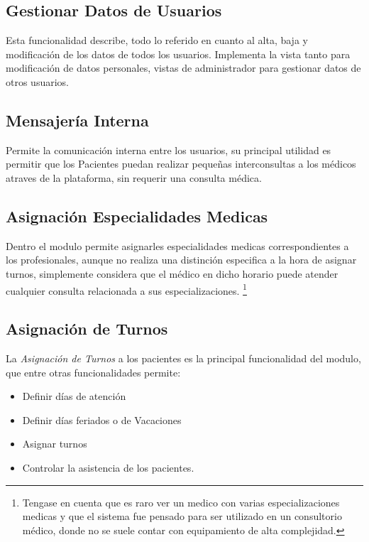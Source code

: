 \subsection{Gestionar Datos de Usuarios}

Esta funcionalidad describe, todo lo referido en cuanto al alta, baja y modificación de los datos de todos los usuarios. Implementa la vista tanto para modificación de datos personales, vistas de administrador para gestionar datos de otros usuarios. 


\subsection{Mensajería Interna}

Permite la comunicación interna entre los usuarios, su principal utilidad es permitir que los Pacientes puedan realizar pequeñas interconsultas a los médicos atraves de la plataforma, sin requerir una consulta médica.

\subsection{Asignación Especialidades Medicas}

Dentro el modulo permite asignarles especialidades medicas correspondientes a los profesionales, aunque no realiza una distinción especifica a la hora de asignar turnos, simplemente considera que el médico en dicho horario puede atender cualquier consulta relacionada a sus especializaciones. \footnote{Tengase en cuenta que es raro ver un medico con varias especializaciones medicas y que el sistema fue pensado para ser utilizado en un consultorio médico, donde no se suele contar con equipamiento de alta complejidad.}


\subsection{Asignación de Turnos}  

La \textit{Asignación de Turnos} a los pacientes es la principal funcionalidad del modulo, que entre otras funcionalidades permite:

\begin{itemize}
    \item Definir días de atención
    \item Definir días feriados o de Vacaciones     
    \item Asignar turnos
    \item Controlar la asistencia de los pacientes.    
\end{itemize}

